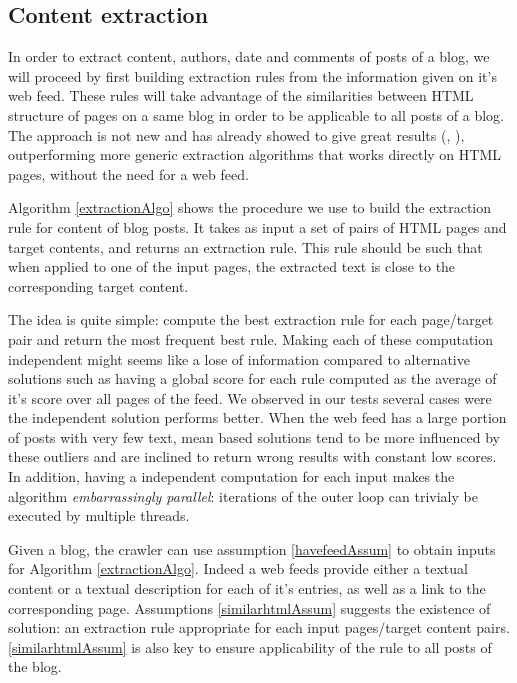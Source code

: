 \subsection{Content extraction}
In order to extract content, authors, date and comments of posts of a blog, we will proceed by first building extraction rules from the information given on it's web feed. These rules will take advantage of the similarities between HTML structure of pages on a same blog in order to be applicable to all posts of a blog. The approach is not new and has already showed to give great results (\cite{gkotsis2013}, \cite{oita2010}), outperforming more generic extraction algorithms that works directly on HTML pages, without the need for a web feed.

\extractionAlgo

Algorithm \ref{extractionAlgo} shows the procedure we use to build the extraction rule for content of blog posts. It takes as input a set of pairs of HTML pages and target contents, and returns an extraction rule. This rule should be such that when applied to one of the input pages, the extracted text is close to the corresponding target content.

The idea is quite simple: compute the best extraction rule for each page/target pair and return the most frequent best rule. Making each of these computation independent might seems like a lose of information compared to alternative solutions such as having a global score for each rule computed as the average of it's score over all pages of the feed. We observed in our tests several cases were the independent solution performs better. When the web feed has a large portion of posts with very few text, mean based solutions tend to be more influenced by these outliers and are inclined to return wrong results with constant low scores. In addition, having a independent computation for each input makes the algorithm \emph{embarrassingly parallel}: iterations of the outer loop can trivialy be executed by multiple threads.

Given a blog, the crawler can use assumption \ref{havefeedAssum} to obtain inputs for Algorithm \ref{extractionAlgo}. Indeed a web feeds provide either a textual content or a textual description for each of it's entries, as well as a link to the corresponding page. Assumptions \ref{similarhtmlAssum} suggests the existence of solution: an extraction rule appropriate for each input pages/target content pairs. \ref{similarhtmlAssum} is also key to ensure applicability of the rule to all posts of the blog.

